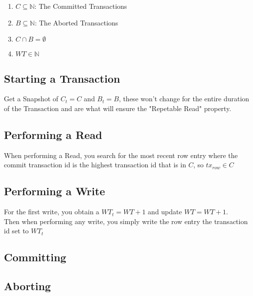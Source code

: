 \documentclass[a4paper, 11pt]{article}
\begin{document}
\begin{enumerate}
\item $C \subseteq \mathbb{N}$: The Committed Transactions
\item $B \subseteq \mathbb{N}$: The Aborted Transactions
\item $C \cap B = \emptyset$
\item $WT \in \mathbb{N}$
\end{enumerate}

\subsection{Starting a Transaction}
Get a Snapshot of $C_t = C$ and $B_t = B$, these won't change for the entire duration of the Transaction and are what
will ensure the "Repetable Read" property.

\subsection{Performing a Read}
When performing a Read, you search for the most recent row entry where the commit transaction id is the highest transaction id
that is in $C$, so $tx_{row} \in C$

\subsection{Performing a Write}
For the first write, you obtain a $WT_t = WT + 1$ and update $WT = WT + 1$. \\
Then when performing any write, you simply write the row entry the transaction id set to $WT_t$

\subsection{Committing}

\subsection{Aborting}
\end{document}

